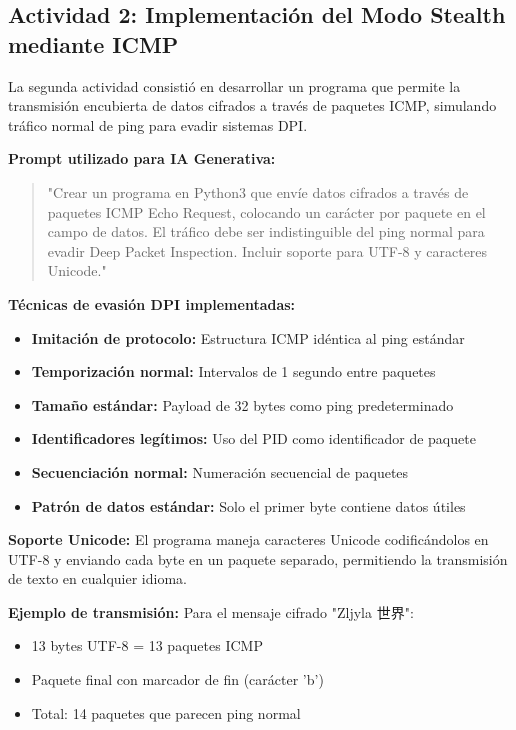 \documentclass[letter,12pt]{article}
\begin{document}
\subsection{Actividad 2: Implementación del Modo Stealth mediante ICMP}

La segunda actividad consistió en desarrollar un programa que permite la transmisión encubierta de datos cifrados a través de paquetes ICMP, simulando tráfico normal de ping para evadir sistemas DPI.

\textbf{Prompt utilizado para IA Generativa:}
\begin{quote}
"Crear un programa en Python3 que envíe datos cifrados a través de paquetes ICMP Echo Request, colocando un carácter por paquete en el campo de datos. El tráfico debe ser indistinguible del ping normal para evadir Deep Packet Inspection. Incluir soporte para UTF-8 y caracteres Unicode."
\end{quote}

\textbf{Técnicas de evasión DPI implementadas:}
\begin{itemize}
    \item \textbf{Imitación de protocolo:} Estructura ICMP idéntica al ping estándar
    \item \textbf{Temporización normal:} Intervalos de 1 segundo entre paquetes
    \item \textbf{Tamaño estándar:} Payload de 32 bytes como ping predeterminado
    \item \textbf{Identificadores legítimos:} Uso del PID como identificador de paquete
    \item \textbf{Secuenciación normal:} Numeración secuencial de paquetes
    \item \textbf{Patrón de datos estándar:} Solo el primer byte contiene datos útiles
\end{itemize}

\textbf{Soporte Unicode:}
El programa maneja caracteres Unicode codificándolos en UTF-8 y enviando cada byte en un paquete separado, permitiendo la transmisión de texto en cualquier idioma.

\textbf{Ejemplo de transmisión:}
Para el mensaje cifrado "Zljyla 世界":
\begin{itemize}
    \item 13 bytes UTF-8 = 13 paquetes ICMP
    \item Paquete final con marcador de fin (carácter 'b')
    \item Total: 14 paquetes que parecen ping normal
\end{itemize}
\end{document}
